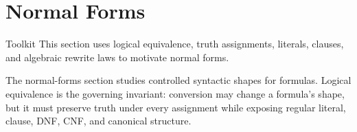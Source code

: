 \section{Normal Forms}

\begin{toolkitbox}{Toolkit}
This section uses logical equivalence, truth assignments, literals, clauses,
and algebraic rewrite laws to motivate normal forms.
\end{toolkitbox}

\begin{remark*}[Exposition]
The normal-forms section studies controlled syntactic shapes for formulas.
Logical equivalence is the governing invariant: conversion may change a
formula's shape, but it must preserve truth under every assignment while
exposing regular literal, clause, DNF, CNF, and canonical structure.
\end{remark*}










